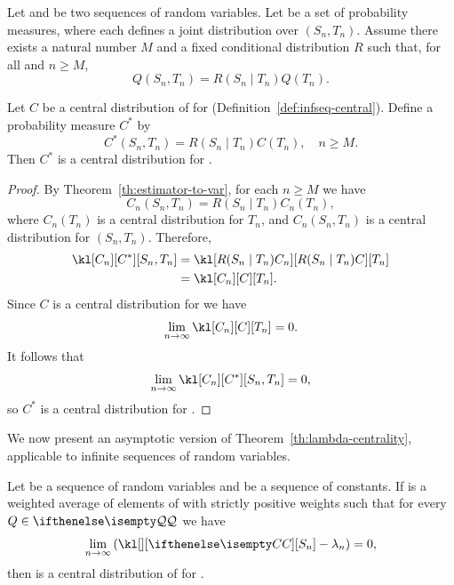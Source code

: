 \begin{theorem}
    \label{th:estimator-to-infseq}
    Let  and  be two sequences of random variables.
    Let \setQ be a set of probability measures, where each  defines a joint distribution
    over $(S_n, T_n)$.
    Assume there exists a natural number $M$ and a fixed conditional distribution $R$
    such that, for all  and $n \geq M$,
    \[
        Q(S_n, T_n) = R(S_n \mid T_n)Q(T_n).
    \]


    Let $C$ be a central distribution of \setQ for  (Definition~\ref{def:infseq-central}).
    Define a probability measure $C^*$ by
    \[
        C^*(S_n, T_n) = R(S_n \mid T_n)C(T_n), \quad n \geq M.
    \]
    Then $C^*$ is a central distribution for .
\end{theorem}

\begin{proof}
    By Theorem~\ref{th:estimator-to-var}, for each $n \geq M$ we have
    \[
        C_n(S_n, T_n) = R(S_n \mid T_n) C_n(T_n),
    \]
    where $C_n(T_n)$ is a central distribution for $T_n$, and $C_n(S_n,  T_n)$ is a central distribution for
    $(S_n, T_n)$.
    Therefore,
    \begin{align*}
        \kl[{C_n}][C^*][S_n, T_n] &= \kl[{R(S_n \mid T_n)C_n}][R(S_n \mid T_n)C][T_n] \\
        &= \kl[{C_n}][C][T_n].
    \end{align*}
    Since $C$ is a central distribution for  we have
    \[
        \toInf \kl[{C_n}][C][T_n] = 0.
    \]
    It follows that
    \[
        \toInf \kl[{C_n}][C^*][S_n, T_n] = 0,
    \]
    so $C^*$ is a central distribution for .
\end{proof}

We now present an asymptotic version of Theorem~\ref{th:lambda-centrality}, applicable to infinite sequences of
random variables.

\begin{theorem}
    \label{th:limiting-centrality}
    Let  be a sequence of random variables and \infSeq{\lambda} be a sequence of constants.
    If \cDist is a weighted average of elements of \setQ with strictly positive weights
    such that for every $Q \in \setQ$ we have
    \[
        \toInf \left(\kl[][\cDist][S_n] - \lambda_n  \right) = 0,
    \]
    then \cDist is a central distribution of \setQ for .
\end{theorem}

